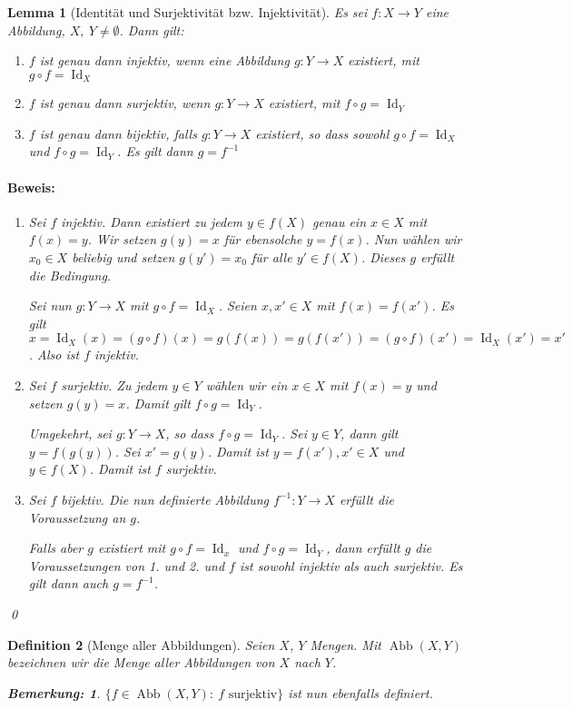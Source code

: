 \documentclass{report}
\newcommand{\IN}[1]{\index{#1|BH}}
\DeclareMathOperator{\abb}{Abb}
\DeclareMathOperator{\Id}{Id}
\theoremstyle{customrem}
\newtheorem*{bemerkung}{Bemerkung\textnormal:}
\theoremstyle{customdef}
\newtheorem{definition}{Definition}[chapter]
\newtheorem{lemma}[definition]{Lemma}
\renewenvironment{proof}{\paragraph{Beweis: }}{\qed}
\theoremstyle{customenv}
\begin{document}
	\begin{lemma}[Identität und Surjektivität bzw. Injektivität]
		Es sei \(f : X \to Y\) eine Abbildung, \(X,\ Y \neq \emptyset\). Dann gilt:
		\begin{enumerate}
			\itemsep0cm
			\item \(f\) ist genau dann injektiv, wenn eine Abbildung \(g : Y \to X\) existiert, mit \(g \circ f = \Id_X\)
			\item \(f\) ist genau dann surjektiv, wenn \(g : Y \to X\) existiert, mit \(f \circ g = \Id_Y\)
			\item \(f\) ist genau dann bijektiv, falls \(g : Y \to X\) existiert, so dass sowohl \(g \circ f = \Id_X\) und \(f \circ g = \Id_Y\). Es gilt dann \(g = f^{-1}\)
		\end{enumerate}
		\begin{proof}
			\begin{enumerate}
				\item Sei \(f\) injektiv. Dann existiert zu jedem \(y \in f(X)\) genau ein \(x \in X\) mit \(f(x) = y\). Wir setzen \(g(y) = x\) für ebensolche \(y = f(x)\). Nun wählen wir \(x_0\in X\) beliebig und setzen \(g(y') = x_0\) für alle \(y' \in f(X)\). Dieses \(g\) erfüllt die Bedingung.

				Sei nun \(g : Y \to X\) mit \(g \circ f = \Id_X\). Seien \(x, x' \in X\) mit \(f(x) = f(x')\). Es gilt \(x = \Id_X(x) = (g \circ f)(x) = g(f(x)) = g(f(x')) = (g \circ f)(x') = \Id_X(x') = x'\). Also ist \(f\) injektiv.
				\item Sei \(f\) surjektiv. Zu jedem \(y \in Y\) wählen wir ein \(x \in X\) mit \(f(x) = y\) und setzen \(g(y) = x\). Damit gilt \(f \circ g = \Id_Y\).

				Umgekehrt, sei \(g : Y \to X\), so dass \(f \circ g = \Id_Y\). Sei \(y \in Y\), dann gilt \(y = f(g(y))\). Sei \(x' = g(y)\). Damit ist \(y = f(x'), x' \in X\) und \(y \in f(X)\). Damit ist \(f\) surjektiv.
				\item Sei \(f\) bijektiv. Die nun definierte Abbildung \(f^{-1} : Y \to X\) erfüllt die Voraussetzung an \(g\).

				Falls aber \(g\) existiert mit \(g \circ f = \Id_x\) und \(f \circ g = \Id_Y\), dann erfüllt \(g\) die Voraussetzungen von 1. und 2. und \(f\) ist sowohl injektiv als auch surjektiv. Es gilt dann auch \(g = f^{-1}\).
			\end{enumerate}
		\end{proof}
	\end{lemma}

	\begin{definition}[Menge aller Abbildungen]
		\IN{Menge aller Abbildungen}
		Seien \(X\), \(Y\) Mengen. Mit \(\abb(X, Y)\) bezeichnen wir die Menge aller Abbildungen von \(X\) nach \(Y\).\\

		\begin{bemerkung}
			\(\{ f \in \abb(X, Y) :\ f \text{ surjektiv}\}\) ist nun ebenfalls definiert.
		\end{bemerkung}
	\end{definition}
\end{document}
